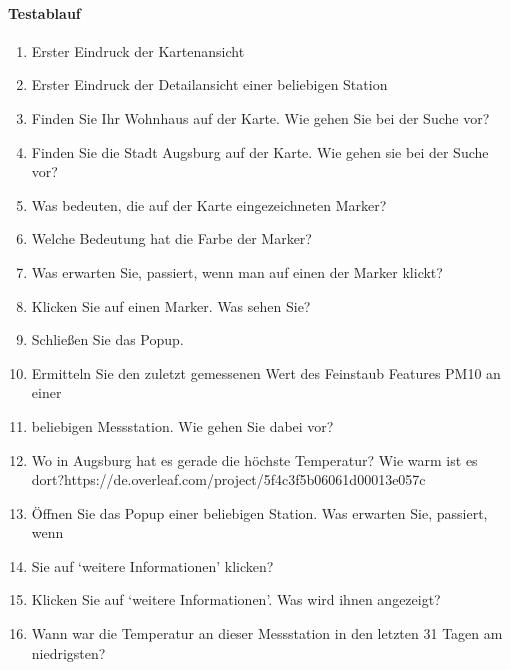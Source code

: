 \paragraph{Testablauf}
\begin{enumerate}
    \item Erster Eindruck der Kartenansicht
 \item Erster Eindruck der Detailansicht einer beliebigen Station
  \item Finden Sie Ihr Wohnhaus auf der Karte. Wie  gehen Sie bei der Suche vor?
 \item  Finden Sie die Stadt Augsburg auf der Karte. Wie gehen sie bei der Suche vor?
 \item Was bedeuten, die auf der Karte eingezeichneten Marker?
  \item Welche Bedeutung hat die Farbe der Marker?
\item Was erwarten Sie, passiert, wenn man auf einen der Marker klickt?
\item Klicken Sie auf einen Marker. Was sehen Sie?
 \item Schließen Sie das Popup.
\item Ermitteln Sie den zuletzt gemessenen Wert des Feinstaub Features PM10 an einer \item beliebigen Messstation. Wie gehen Sie dabei vor?
\item Wo in Augsburg hat es gerade die höchste Temperatur? Wie warm ist es dort?https://de.overleaf.com/project/5f4c3f5b06061d00013e057c
\item Öffnen Sie das Popup einer beliebigen Station. Was erwarten Sie, passiert, wenn \item Sie auf ‘weitere Informationen’ klicken?
\item Klicken Sie auf ‘weitere Informationen’. Was wird ihnen angezeigt?
\item Wann war die Temperatur an dieser Messstation in den letzten 31 Tagen am niedrigsten?

\end{enumerate}
